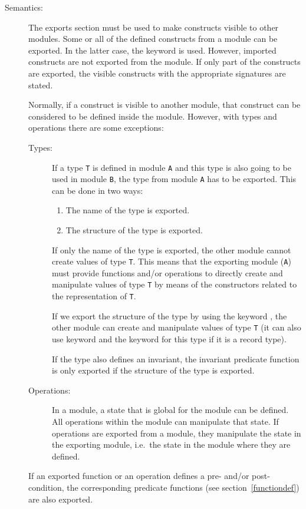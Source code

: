 \documentclass[\pformat,12pt]{article}
\begin{document}
\begin{description}
\item[Semantics:] The exports section must be used to make constructs
  visible to other modules. Some or all of the defined
  constructs from a module can be exported. In the latter case, the keyword
   is used. However, imported constructs are not exported
  from the module. If only part 
  of the constructs are exported, the visible constructs with
  the appropriate signatures are stated.

  Normally, if a construct is visible to another module,
  that construct can be considered
   to be defined inside the module. However, with types and
  operations there are some exceptions:
  \begin{description}
  \item[Types:] If a type {\tt T} is defined in module {\tt A} and
    this type is also going to be used in module {\tt B}, the type
    from module {\tt A} has to be exported. This can be done in two ways:
    \begin{enumerate}
    \item The name of the type is exported.
    \item The structure of the type is exported.
    \end{enumerate}
    If only the name of the type is exported, the other module cannot create
    values of type {\tt T}. This means that the exporting module ({\tt A})
    must provide functions and/or operations to directly create and manipulate
    values of type {\tt T} by means of the constructors related to the
    representation of {\tt T}. 

    If we export the structure of the type by using the keyword
    , the other module can create and manipulate values of
    type {\tt T} (it can also use  keyword and the
     keyword for this type if it is a record type).

    If the type also defines an invariant, the invariant predicate function
    is only exported if the structure of the type is exported.

  \item[Operations:] In a module, a state that is global for
    the module can be defined. All operations within the module can
    manipulate that state. If operations are exported from a module, they
     manipulate the state in the exporting module,
      i.e.\ the state in the module where they are defined.
  \end{description}

  If an exported function or an operation defines a pre- and/or
  post-condition, the corresponding predicate functions (see
  section~\ref{functiondef}) are also exported.


\end{description}
\end{document}
